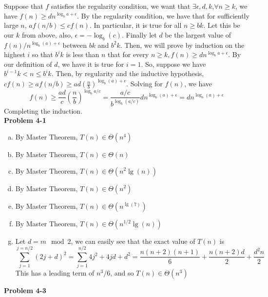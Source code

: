 \documentclass{article}
\begin{document}
Suppose that $f$ satisfies the regularity condition, we want that $\exists \epsilon, d,k$,$\forall n\ge k$, we have $f(n) \ge d n^{\log_b a +\epsilon}$. By the regularity condition, we have that for sufficiently large $n$, $af(n/b) \le cf(n)$. In particular, it is true for all $n\ge bk$. Let this be our $k$ from above, also, $\epsilon= -\log_b(c)$. Finally let $d$ be the largest value of $f(n)/n^{\log_b(a)+\epsilon}$ between $bk$ and $b^2k$. Then, we will prove by induction on the highest $i$ so that $b^i k$ is less than $n$ that for every $n\ge k, f(n) \ge d n^{\log_b a +\epsilon}$. By our definition of $d$, we have it is true for $i= 1$. So, suppose we have $b^{i-1}k < n \le b^i k$. Then, by regularity and the inductive hypothesis,  $cf(n) \ge a f(n/b) \ge ad \left(\frac{n}{b}\right)^{\log_b(a) +\epsilon}$. Solving for $f(n)$, we have
\[
f(n) \ge \frac{ad}{c} \left(\frac{n}{b}\right)^{\log_b{a/c}} = \frac{a/c}{b^{\log_b(a/c)}} d n^{\log_b(a) + \epsilon} =  d n^{\log_b(a) + \epsilon}
\]
Completing the induction. \\
\noindent\textbf{Problem 4-1}\\
\begin{enumerate}[a)]
\item
By Master Theorem, $T(n) \in \Theta(n^4)$

\item
By Master Theorem, $T(n) \in \Theta(n)$

\item
By Master Theorem, $T(n) \in \Theta(n^2\lg(n))$

\item
By Master Theorem, $T(n) \in \Theta(n^2)$

\item
By Master Theorem, $T(n) \in \Theta(n^{\lg(7)})$

\item
By Master Theorem, $T(n) \in \Theta(n^{1/2}\lg(n))$

\item
Let $d = m\mod 2$, we can easily see that the exact value of $T(n)$ is
\[
\sum_{j=1}^{j=n/2} (2j+d)^2 = \sum_{j=1}^{n/2}4j^2 + 4jd + d^2 = \frac{n(n+2)(n+1)}{6} + \frac{n(n+2)d}{2} + \frac{d^2n}{2}
\]
This has a leading term of $n^3/6$, and so $T(n) \in \Theta(n^3)$

\end{enumerate}
\noindent\textbf{Problem 4-3}\\
\end{document}
